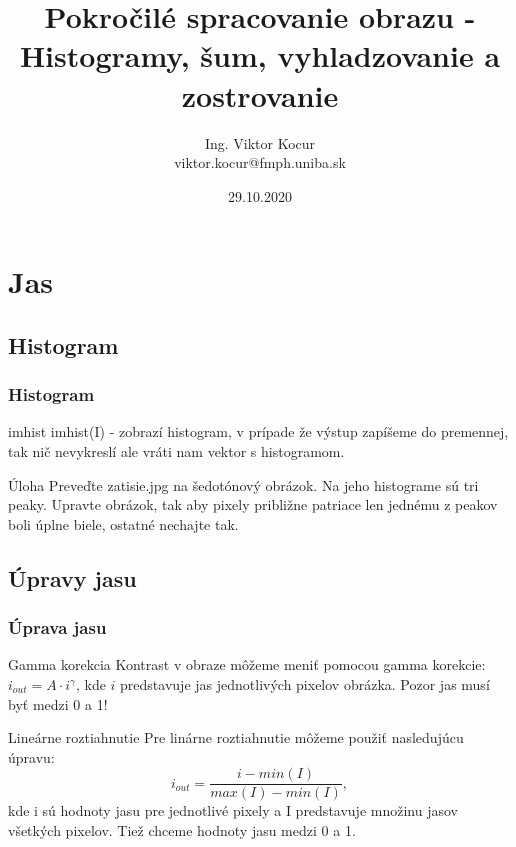\documentclass{beamer}
\title[5. cvičenie]{Pokročilé spracovanie obrazu - Histogramy, šum, vyhladzovanie a zostrovanie}
\author[Kocur]{Ing. Viktor Kocur \\{\small viktor.kocur@fmph.uniba.sk}}
\institute{DAI FMFI UK}
\date{29.10.2020}
\begin{document}

\begin{frame}
  \titlepage
\end{frame}

\section{Jas}
\subsection{Histogram}
\begin{frame}
\frametitle{Histogram}
\begin{block}{imhist}
imhist(I) - zobrazí histogram, v prípade že výstup zapíšeme do premennej, tak nič nevykreslí ale vráti nam vektor s histogramom.
\end{block}

\begin{block}{Úloha}
Preveďte zatisie.jpg na šedotónový obrázok. Na jeho histograme sú tri peaky. Upravte obrázok, tak aby pixely približne patriace len jednému z peakov boli úplne biele, ostatné nechajte tak.
\end{block}
\end{frame}

\subsection{Úpravy jasu}
\begin{frame}
\frametitle{Úprava jasu}
\begin{block}{Gamma korekcia}
Kontrast v obraze môžeme meniť pomocou gamma korekcie: $i_{out} = A \cdot i^{\gamma}$, kde $i$ predstavuje jas jednotlivých pixelov obrázka. Pozor jas musí byť medzi 0 a 1!
\end{block}

\begin{block}{Lineárne roztiahnutie}
Pre linárne roztiahnutie môžeme použiť nasledujúcu úpravu:
\begin{equation*}
i_{out} = \frac{i - min (I)}{max(I) - min(I)},\end{equation*}
kde i sú hodnoty jasu pre jednotlivé pixely a I predstavuje množinu jasov všetkých pixelov. Tiež chceme hodnoty jasu medzi 0 a 1.
\end{block}
\end{frame}
\end{document}
